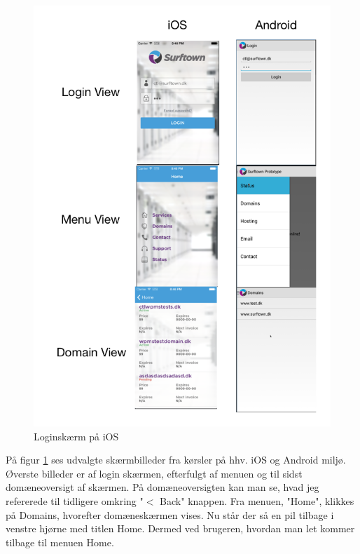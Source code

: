 \documentclass[12pt]{article}
\begin{document}
\begin{figure}[!h]
	\includegraphics[width=12cm]{Screenshots.png}
	\caption{Loginskærm på iOS}
	\label{ss}
\end{figure}
\newpage

På figur \ref{ss} ses udvalgte skærmbilleder fra kørsler på hhv. iOS og Android miljø. Øverste billeder er af login skærmen, efterfulgt af menuen og til sidst domæneoversigt af skærmen. På domæneoversigten kan man se, hvad jeg refererede til tidligere omkring "$ < $ Back" knappen. Fra menuen, "Home", klikkes på Domains, hvorefter domæneskærmen vises. Nu står der så en pil tilbage i venstre hjørne med titlen Home. Dermed ved brugeren, hvordan man let kommer tilbage til menuen Home. 
\end{document}
